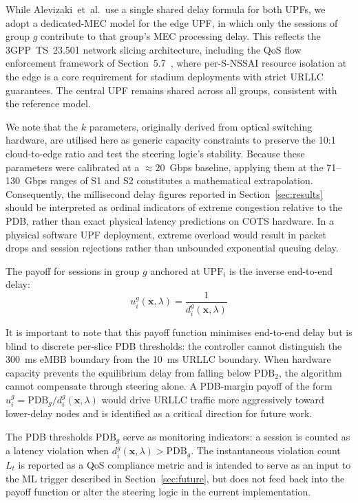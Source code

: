 \documentclass[conference]{IEEEtran}
\begin{document}
While Alevizaki~et~al.\ use a single shared delay formula for
both UPFs, we adopt a dedicated-MEC model for the edge UPF, in
which only the sessions of group $g$ contribute to that group's
MEC processing delay. This reflects the 3GPP~TS~23.501 network
slicing architecture, including the QoS flow enforcement framework
of Section~5.7~\cite{3gpp_ts23501}, where per-S-NSSAI resource
isolation at the edge is a core requirement for stadium
deployments with strict URLLC guarantees. The central UPF remains
shared across all groups, consistent with the reference model.

We note that the $k$ parameters, originally derived from optical
switching hardware, are utilised here as generic capacity
constraints to preserve the 10:1 cloud-to-edge ratio and test
the steering logic's stability. Because these parameters were
calibrated at a $\approx 20$~Gbps baseline, applying them at the
71--130~Gbps ranges of S1 and S2 constitutes a mathematical
extrapolation. Consequently, the millisecond delay figures reported
in Section~\ref{sec:results} should be interpreted as ordinal
indicators of extreme congestion relative to the PDB, rather than
exact physical latency predictions on COTS hardware. In a physical
software UPF deployment, extreme overload would result in packet
drops and session rejections rather than unbounded exponential
queuing delay.

The payoff for sessions in group $g$ anchored at
$\text{UPF}_i$ is the inverse end-to-end delay:
\begin{equation}
    u_i^g(\mathbf{x},\lambda) =
    \frac{1}{d_i^g(\mathbf{x},\lambda)}
    \label{eq:payoff}
\end{equation}

It is important to note that this payoff function minimises
end-to-end delay but is blind to discrete per-slice PDB thresholds:
the controller cannot distinguish the 300~ms eMBB boundary from
the 10~ms URLLC boundary. When hardware capacity prevents the
equilibrium delay from falling below $\text{PDB}_2$, the algorithm
cannot compensate through steering alone. A PDB-margin payoff of
the form $u_i^g = \text{PDB}_g / d_i^g(\mathbf{x},\lambda)$ would
drive URLLC traffic more aggressively toward lower-delay nodes and
is identified as a critical direction for future work.

The PDB thresholds $\text{PDB}_g$ serve as monitoring
indicators: a session is counted as a latency violation
when $d_i^g(\mathbf{x},\lambda) > \text{PDB}_g$.
The instantaneous violation count $L_t$ is reported as
a QoS compliance metric and is intended to serve as an
input to the ML trigger described in
Section~\ref{sec:future}, but does not feed back into
the payoff function or alter the steering logic in the
current implementation.
\end{document}

